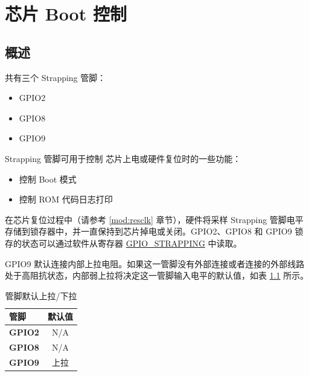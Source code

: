 \documentclass[main\_\_CN.tex]{subfiles}
\begin{document}

\ifglobal
\else
    {\let\clearpage\relax \listoftodos}
    \tableofcontents
\fi



\hypertarget{bootctrl}{}
\chapter{芯片 Boot 控制}
\label{mod:bootctrl}


\section{概述}

\chipname{} 共有三个 Strapping 管脚：
\begin{itemize}
    \item GPIO2
    \item GPIO8
    \item GPIO9
\end{itemize}

Strapping 管脚可用于控制 \chipname{} 芯片上电或硬件复位时的一些功能：
\begin{itemize}
    \item 控制 Boot 模式
    \item 控制 ROM 代码日志打印
\end{itemize}

在芯片复位过程中（请参考 \ref{mod:resclk} \textit{}章节），硬件将采样 Strapping 管脚电平存储到锁存器中，并一直保持到芯片掉电或关闭。GPIO2、GPIO8 和 GPIO9 锁存的状态可以通过软件从寄存器 \hyperref[fielddesc:GPIOSTRAPPING]{GPIO\_STRAPPING}
中读取。

GPIO9 默认连接内部上拉电阻。如果这一管脚没有外部连接或者连接的外部线路处于高阻抗状态，内部弱上拉将决定这一管脚输入电平的默认值，如表 \ref{tab:bootctrl-default-config-strapping-pins} 所示。

\begin{longtable}[c]{|p{1.5cm}|c|}
\caption{管脚默认上拉/下拉}
\label{tab:bootctrl-default-config-strapping-pins} \\
    \hline
    \rowcolor{lightgray}
  \textbf{管脚} & \textbf{默认值} \\ \hline
  \textbf{GPIO2} & N/A \\ \hline
  \textbf{GPIO8} & N/A \\ \hline
  \textbf{GPIO9} & 上拉 \\ \hline
\end{longtable}
\end{document}
